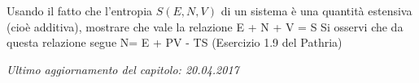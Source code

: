 
\begin{Exercise}[label={ex2:Saddit}, title={Estensività dell'entropia}]
Usando il fatto che l'entropia $S(E,N,V)$ di un sistema è una quantità estensiva (cioè additiva), mostrare che vale la relazione
\be
E + N + V = S
\ee
Si osservi che da questa relazione segue
\be
N\mu = E + PV - TS
\ee
(Esercizio 1.9 del Pathria)
\end{Exercise}


\vskip 0.75cm
\begin{flushright}
{\em Ultimo aggiornamento del capitolo: 20.04.2017}
\end{flushright}
